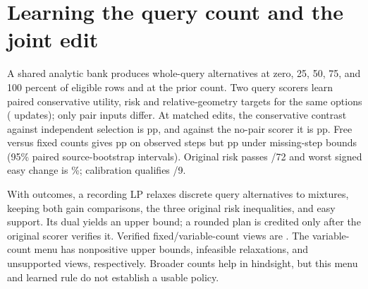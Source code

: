 \section{Learning the query count and the joint edit}
A shared analytic bank produces whole-query alternatives at zero,
25, 50, 75, and 100 percent of eligible rows and at the prior count.
Two query scorers learn paired conservative utility, risk and
relative-geometry targets for the same options
(\JointCountUpdates{} updates); only pair inputs differ.
At \JointCountEdits{} matched edits, the conservative contrast
against independent selection is \JointCountInd{} pp, and
against the no-pair scorer it is \JointCountPair{} pp.
Free versus fixed counts gives \JointCountCountKnown{} pp on
observed steps but \JointCountCount{} pp under missing-step bounds
(95\% paired source-bootstrap intervals). Original risk passes
\JointCountPasses{}/72 and worst signed easy change is
\JointCountWorst{}\%; calibration qualifies \JointCountQual{}/9.

With outcomes, a recording LP relaxes discrete query alternatives
to mixtures, keeping both gain comparisons, the three original risk
inequalities, and easy support. Its dual yields an upper bound; a
rounded plan is credited only after the original scorer verifies it.
Verified fixed/variable-count views are \JointCountVerified{}.
The variable-count menu has \JointCountFailed{} nonpositive
upper bounds, infeasible relaxations, and unsupported views,
respectively. Broader counts help in hindsight, but this menu
and learned rule do not establish a usable policy.
